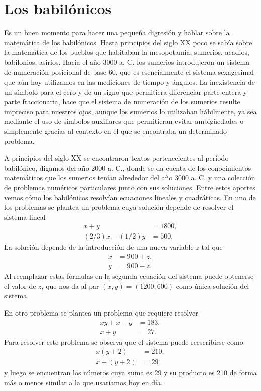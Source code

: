 \section*{Los babilónicos}

Es un buen momento para hacer una pequeña digresión y hablar sobre la
matemática de los babilónicos.  Hasta principios del siglo XX poco se sabía
sobre la matemática de los pueblos que habitaban la mesopotamia, sumerios,
acadios, babilonios, asirios. Hacia el año 3000 a. C. los sumerios introdujeron
un sistema de numeración posicional de base 60, que es esencialmente el sistema
sexagesimal que aún hoy utilizamos en las mediciones de tiempo y ángulos. La
inexistencia de un símbolo para el cero y de un signo que permitiera
diferenciar parte entera y parte fraccionaria, hace que el sistema de
numeración de los sumerios resulte impreciso para nuestros ojos, aunque los
sumerios lo utilizaban hábilmente, ya sea mediante el uso de símbolos
auxiliares que permitieran evitar ambigüedades o simplemente gracias al
contexto en el que se encontraba un determinado problema. 

A principios del siglo XX se encontraron textos pertenecientes al período
babilónico, digamos del año 2000 a. C., donde se da cuenta de los conocimientos
matemáticos que los sumerios tenían alrededor del año 3000 a. C. y una
colección de problemas numéricos particulares junto con sus soluciones. Entre
estos aportes vemos cómo los babilónicos resolvían ecuaciones lineales y
cuadráticas. 
En uno de los problemas se plantea un problema cuya solución depende de resolver
el sistema lineal
\begin{align*}
	x+y &= 1800,\\
	(2/3)x-(1/2)y&=500.
\end{align*}
La solución depende de la introducción de una nueva variable $z$ tal que
\begin{align*}
x&=900+z,\\
y&=900-z.     
\end{align*}
Al reemplazar estas fórmulas en la segunda ecuación del
sistema puede obtenerse el valor de $z$, que nos da al par $(x,y)=(1200,600)$
como única solución del sistema. 

En otro problema se plantea un problema que requiere resolver 
\begin{align*}
	xy+x-y &= 183,\\
	x+y&=27.
\end{align*}
Para resolver este problema se observa que el sistema puede reescribirse como 
\begin{align*}
	x(y+2)&=210,\\
	x+(y+2)&=29
\end{align*}
y luego se encuentran los números cuya suma es 29 y su producto es 210 de forma
más o menos similar a la que usaríamos hoy en día.

